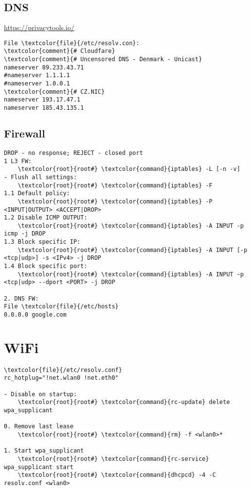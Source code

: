 \documentclass[10pt, a4paper, onecolumn, openany]{book}         %
\begin{document}
\subsection{DNS}
\underline{\url{https://privacytools.io/}}
\begin{Verbatim}[commandchars=\\\{\}]
File \textcolor{file}{/etc/resolv.con}:
\textcolor{comment}{# Cloudfare}
\textcolor{comment}{# Uncensored DNS - Denmark - Unicast}
nameserver 89.233.43.71
#nameserver 1.1.1.1
#nameserver 1.0.0.1
\textcolor{comment}{# CZ.NIC}
nameserver 193.17.47.1
nameserver 185.43.135.1
\end{Verbatim}

\subsection{Firewall}
\begin{Verbatim}[commandchars=\\\{\}]
DROP - no response; REJECT - closed port
1 L3 FW:
    \textcolor{root}{root#} \textcolor{command}{iptables} -L [-n -v]
- Flush all settings:
    \textcolor{root}{root#} \textcolor{command}{iptables} -F
1.1 Default policy:
    \textcolor{root}{root#} \textcolor{command}{iptables} -P <INPUT|OUTPUT> <ACCEPT|DROP>
1.2 Disable ICMP OUTPUT:
    \textcolor{root}{root#} \textcolor{command}{iptables} -A INPUT -p icmp -j DROP
1.3 Block specific IP:
    \textcolor{root}{root#} \textcolor{command}{iptables} -A INPUT [-p <tcp|udp>] -s <IPv4> -j DROP
1.4 Block specific port:
    \textcolor{root}{root#} \textcolor{command}{iptables} -A INPUT -p <tcp|udp> --dport <PORT> -j DROP

2. DNS FW:
File \textcolor{file}{/etc/hosts}
0.0.0.0 google.com
\end{Verbatim}

\section{WiFi}
\begin{Verbatim}[commandchars=\\\{\}]
\textcolor{file}{/etc/resolv.conf}
rc_hotplug="!net.wlan0 !net.eth0"

- Disable on startup:
    \textcolor{root}{root#} \textcolor{command}{rc-update} delete wpa_supplicant

0. Remove last lease
    \textcolor{root}{root#} \textcolor{command}{rm} -f <wlan0>*

1. Start wpa_supplicant
    \textcolor{root}{root#} \textcolor{command}{rc-service} wpa_supplicant start
    \textcolor{root}{root#} \textcolor{command}{dhcpcd} -4 -C resolv.conf <wlan0> 
\end{Verbatim}
\end{document}
